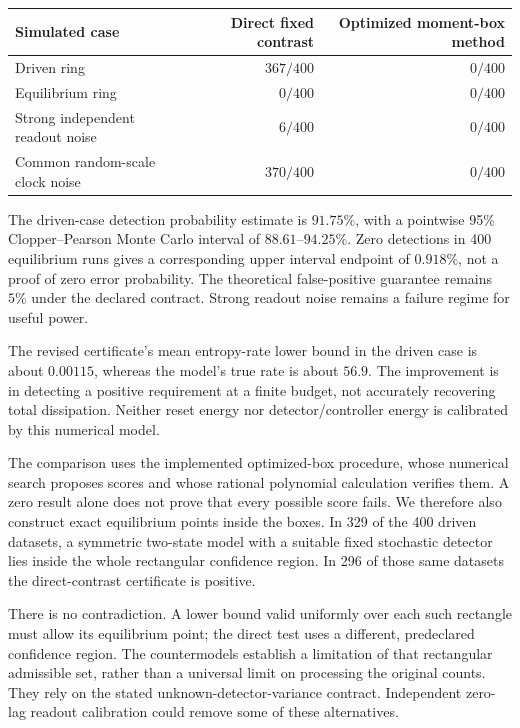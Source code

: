 \begin{center}
\begin{tabular}{lrr}
\toprule
Simulated case & Direct fixed contrast & Optimized moment-box method\\
\midrule
Driven ring & $367/400$ & $0/400$\\
Equilibrium ring & $0/400$ & $0/400$\\
Strong independent readout noise & $6/400$ & $0/400$\\
Common random-scale clock noise & $370/400$ & $0/400$\\
\bottomrule
\end{tabular}
\end{center}
The driven-case detection probability estimate is $91.75\%$, with a pointwise
95\% Clopper--Pearson Monte Carlo interval of $88.61$--$94.25\%$. Zero detections
in 400 equilibrium runs gives a corresponding upper interval endpoint of
$0.918\%$, not a proof of zero error probability. The theoretical false-positive
guarantee remains $5\%$ under the declared contract. Strong readout noise
remains a failure regime for useful power.

The revised certificate's mean entropy-rate lower bound in the driven case is
about $0.00115$, whereas the model's true rate is about $56.9$. The improvement
is in detecting a positive requirement at a finite budget, not accurately
recovering total dissipation. Neither reset energy nor detector/controller
energy is calibrated by this numerical model.

The comparison uses the implemented optimized-box procedure, whose numerical
search proposes scores and whose rational polynomial calculation verifies them.
A zero result alone does not prove that every possible score fails. We therefore
also construct exact equilibrium points inside the boxes. In 329 of the 400
driven datasets, a symmetric two-state model with a suitable fixed stochastic
detector lies inside the whole rectangular confidence region. In 296 of those
same datasets the direct-contrast certificate is positive.

There is no contradiction. A lower bound valid uniformly over each such
rectangle must allow its equilibrium point; the direct test uses a different,
predeclared confidence region. The countermodels establish a limitation of
that rectangular admissible set, rather than a universal limit on processing
the original counts. They rely on the stated unknown-detector-variance contract.
Independent zero-lag readout calibration could remove some of these alternatives.

